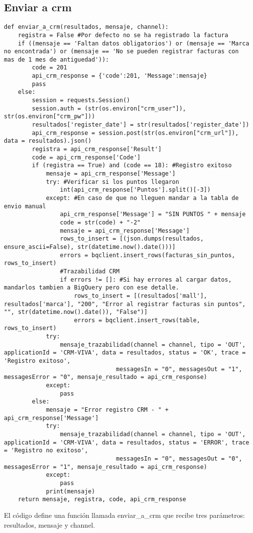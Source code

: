 \documentclass{article}
\begin{document}
\subsection{Enviar a crm}
\begin{lstlisting}
def enviar_a_crm(resultados, mensaje, channel):
    registra = False #Por defecto no se ha registrado la factura
    if ((mensaje == 'Faltan datos obligatorios') or (mensaje == 'Marca no encontrada') or (mensaje == 'No se pueden registrar facturas con mas de 1 mes de antiguedad')):
        code = 201
        api_crm_response = {'code':201, 'Message':mensaje}
        pass
    else:
        session = requests.Session()
        session.auth = (str(os.environ["crm_user"]), str(os.environ["crm_pw"]))
        resultados['register_date'] = str(resultados['register_date'])
        api_crm_response = session.post(str(os.environ["crm_url"]), data = resultados).json()
        registra = api_crm_response['Result']
        code = api_crm_response['Code']
        if (registra == True) and (code == 18): #Registro exitoso
            mensaje = api_crm_response['Message']
            try: #Verificar si los puntos llegaron
                int(api_crm_response['Puntos'].split()[-3])
            except: #En caso de que no lleguen mandar a la tabla de envio manual
                api_crm_response['Message'] = "SIN PUNTOS " + mensaje 
                code = str(code) + "-2"
                mensaje = api_crm_response['Message']
                rows_to_insert = [(json.dumps(resultados, ensure_ascii=False), str(datetime.now().date()))]
                errors = bqclient.insert_rows(facturas_sin_puntos, rows_to_insert)
                #Trazabilidad CRM
                if errors != []: #Si hay errores al cargar datos, mandarlos tambien a BigQuery pero con ese detalle.
                    rows_to_insert = [(resultados['mall'], resultados['marca'], "200", "Error al registrar facturas sin puntos", "", str(datetime.now().date()), "False")]
                    errors = bqclient.insert_rows(table, rows_to_insert)
            try: 
                mensaje_trazabilidad(channel = channel, tipo = 'OUT', applicationId = 'CRM-VIVA', data = resultados, status = 'OK', trace = 'Registro exitoso',
                                messagesIn = "0", messagesOut = "1", messagesError = "0", mensaje_resultado = api_crm_response)
            except:
                pass
        else:
            mensaje = "Error registro CRM - " + api_crm_response['Message']
            try: 
                mensaje_trazabilidad(channel = channel, tipo = 'OUT', applicationId = 'CRM-VIVA', data = resultados, status = 'ERROR', trace = 'Registro no exitoso',
                                messagesIn = "0", messagesOut = "0", messagesError = "1", mensaje_resultado = api_crm_response)
            except:
                pass
            print(mensaje)
    return mensaje, registra, code, api_crm_response
\end{lstlisting}
El código define una función llamada enviar\_a\_crm que recibe tres parámetros: resultados, mensaje y channel.
\end{document}
